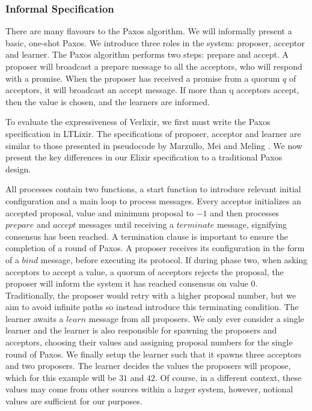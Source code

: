 \subsubsection{Informal Specification}
There are many flavours to the Paxos algorithm. We will informally present a basic, one-shot Paxos. We introduce three roles in the system: proposer, acceptor and learner. The Paxos algorithm performs two steps: prepare and accept. A proposer will broadcast a prepare message to all the acceptors, who will respond with a promise. When the proposer has received a promise from a quorum $q$ of acceptors, it will broadcast an accept message. If more than q acceptors accept, then the value is chosen, and the learners are informed.
\par
To evaluate the expressiveness of Verlixir, we first must write the Paxos specification in LTLixir. The specifications of proposer, acceptor and learner are similar to those presented in pseudocode by Marzullo, Mei and Meling \cite{Paxos_pseudocode}. We now present the key differences in our Elixir specification to a traditional Paxos design.
\par
All processes contain two functions, a start function to introduce relevant initial configuration and a main loop to process messages. Every acceptor initializes an accepted proposal, value and minimum proposal to $-1$ and then processes $prepare$ and $accept$ messages until receiving a $terminate$ message, signifying consensus has been reached. A termination clause is important to ensure the completion of a round of Paxos. A proposer receives its configuration in the form of a $bind$ message, before executing its protocol. If during phase two, when asking acceptors to accept a value, a quorum of acceptors rejects the proposal, the proposer will inform the system it has reached consensus on value $0$. Traditionally, the proposer would retry with a higher proposal number, but we aim to avoid infinite paths so instead introduce this terminating condition. The learner awaits a $learn$ message from all proposers. We only ever consider a single learner and the learner is also responsible for spawning the proposers and acceptors, choosing their values and assigning proposal numbers for the single round of Paxos. We finally setup the learner such that it spawns three acceptors and two proposers. The learner decides the values the proposers will propose, which for this example will be $31$ and $42$. Of course, in a different context, these values may come from other sources within a larger system, however, notional values are sufficient for our purposes.
